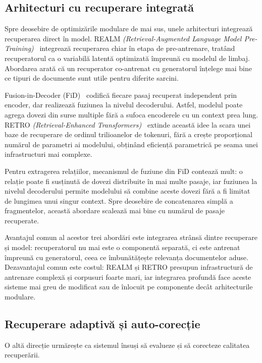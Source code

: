 \subsection{Arhitecturi cu recuperare integrată}

Spre deosebire de optimizările modulare de mai sus, unele arhitecturi integrează recuperarea direct în model. REALM \textit{(Retrieval-Augmented Language Model Pre-Training)}~\cite{guu2020realm} integrează recuperarea chiar în etapa de pre-antrenare, tratând recuperatorul ca o variabilă latentă optimizată împreună cu modelul de limbaj. Abordarea arată că un recuperator co-antrenat cu generatorul înțelege mai bine ce tipuri de documente sunt utile pentru diferite sarcini.

Fusion-in-Decoder (FiD)~\cite{izacard2021fid} codifică fiecare pasaj recuperat independent prin encoder, dar realizează fuziunea la nivelul decoderului. Astfel, modelul poate agrega dovezi din surse multiple fără a sufoca encoderele cu un context prea lung. RETRO \textit{(Retrieval-Enhanced Transformers)}~\cite{borgeaud2022retro} extinde această idee la scara unei baze de recuperare de ordinul trilioanelor de tokenuri, fără a crește proporțional numărul de parametri ai modelului, obținând eficiență parametrică pe seama unei infrastructuri mai complexe.

Pentru extragerea relațiilor, mecanismul de fuziune din FiD contează mult: o relație poate fi susținută de dovezi distribuite în mai multe pasaje, iar fuziunea la nivelul decoderului permite modelului să combine aceste dovezi fără a fi limitat de lungimea unui singur context. Spre deosebire de concatenarea simplă a fragmentelor, această abordare scalează mai bine cu numărul de pasaje recuperate.

Avantajul comun al acestor trei abordări este integrarea strânsă dintre recuperare și model: recuperatorul nu mai este o componentă separată, ci este antrenat împreună cu generatorul, ceea ce îmbunătățește relevanța documentelor aduse. Dezavantajul comun este costul: REALM și RETRO presupun infrastructură de antrenare complexă și corpusuri foarte mari, iar integrarea profundă face aceste sisteme mai greu de modificat sau de înlocuit pe componente decât arhitecturile modulare.

\subsection{Recuperare adaptivă și auto-corecție}

O altă direcție urmărește ca sistemul însuși să evalueze și să corecteze calitatea recuperării.

